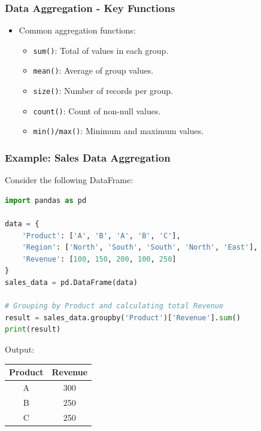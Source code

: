 \documentclass{beamer}
\begin{document}
\begin{frame}[fragile]
    \frametitle{Data Aggregation - Key Functions}
    \begin{itemize}
        \item Common aggregation functions:
        \begin{itemize}
            \item \texttt{sum()}: Total of values in each group.
            \item \texttt{mean()}: Average of group values.
            \item \texttt{size()}: Number of records per group.
            \item \texttt{count()}: Count of non-null values.
            \item \texttt{min()/max()}: Minimum and maximum values.
        \end{itemize}
    \end{itemize}
\end{frame}

\begin{frame}[fragile]
    \frametitle{Example: Sales Data Aggregation}
    Consider the following DataFrame:
    \begin{lstlisting}[language=Python]
import pandas as pd

data = {
    'Product': ['A', 'B', 'A', 'B', 'C'],
    'Region': ['North', 'South', 'South', 'North', 'East'],
    'Revenue': [100, 150, 200, 100, 250]
}
sales_data = pd.DataFrame(data)

# Grouping by Product and calculating total Revenue
result = sales_data.groupby('Product')['Revenue'].sum()
print(result)
    \end{lstlisting}
    
    Output:
    \begin{center}
    \begin{tabular}{|c|c|}
        \hline
        Product & Revenue \\
        \hline
        A & 300 \\
        B & 250 \\
        C & 250 \\
        \hline
    \end{tabular}
    \end{center}
\end{frame}
\end{document}
